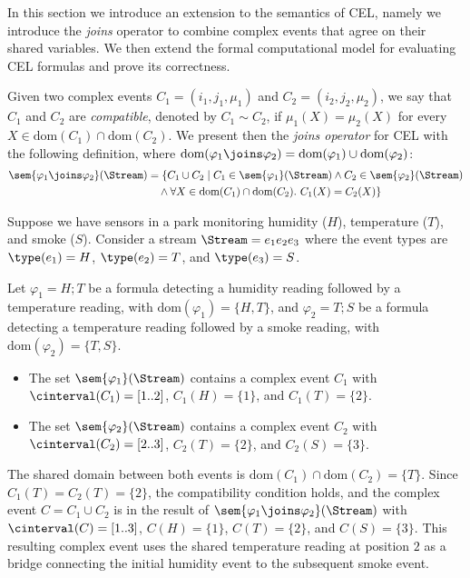 In this section we introduce an extension to the semantics of CEL, namely we introduce the \textit{joins} operator to combine complex events that agree on their shared variables. 
We then extend the formal computational model for evaluating CEL formulas and prove its correctness. 

Given two complex events $C_1 = (i_1, j_1, \mu_1)$ and $C_2 = (i_2, j_2, \mu_2)$, we say that $C_1$ and $C_2$ are \emph{compatible}, denoted by $C_1 \sim C_2$, if $\mu_1(X) = \mu_2(X)$ for every $X \in \text{dom}(C_1) \cap \text{dom}(C_2)$. We present then the \emph{joins operator} for CEL with the following definition, where $\text{dom}(\varphi_1 \joins \varphi_2) = \text{dom}(\varphi_1) \cup \text{dom}(\varphi_2)$:
\[ 
\begin{aligned}
	\sem{\varphi_1 \joins \varphi_2}(\Stream)
	&= \{C_1 \cup C_2 \mid C_1 \in \sem{\varphi_1}(\Stream) 
	\land C_2 \in \sem{\varphi_2}(\Stream) \\
	&\quad \land \forall X \in \text{dom}(C_1) \cap \text{dom}(C_2).\ C_1(X) = C_2(X)\}
\end{aligned}
\]

\begin{example} Suppose we have sensors in a park monitoring humidity ($H$), temperature ($T$), and smoke ($S$). Consider a stream $\Stream = e_1 e_2 e_3$ where the event types are $\type(e_1) = H$, $\type(e_2) = T$, and $\type(e_3) = S$. 
	
	Let $\varphi_1 = H ; T$ be a formula detecting a humidity reading followed by a temperature reading, with $\text{dom}(\varphi_1) = \{H, T\}$, and $\varphi_2 = T ; S$ be a formula detecting a temperature reading followed by a smoke reading, with $\text{dom}(\varphi_2) = \{T, S\}$.
	\begin{itemize}
		\item The set $\sem{\varphi_1}(\Stream)$ contains a complex event $C_1$ with $\cinterval(C_1) = [1..2]$, $C_1(H) = \{1\}$, and $C_1(T) = \{2\}$.
		\item The set $\sem{\varphi_2}(\Stream)$ contains a complex event $C_2$ with $\cinterval(C_2) = [2..3]$, $C_2(T) = \{2\}$, and $C_2(S) = \{3\}$.
	\end{itemize}
	
	The shared domain between both events is $\text{dom}(C_1) \cap \text{dom}(C_2) = \{T\}$. Since $C_1(T) = C_2(T) = \{2\}$, the compatibility condition holds, and the complex event $C = C_1 \cup C_2$ is in the result of $\sem{\varphi_1 \joins \varphi_2}(\Stream)$ with $\cinterval(C) = [1..3]$, $C(H) = \{1\}$, $C(T) = \{2\}$, and $C(S) = \{3\}$. This resulting complex event uses the shared temperature reading at position $2$ as a bridge connecting the initial humidity event to the subsequent smoke event.
\end{example}

